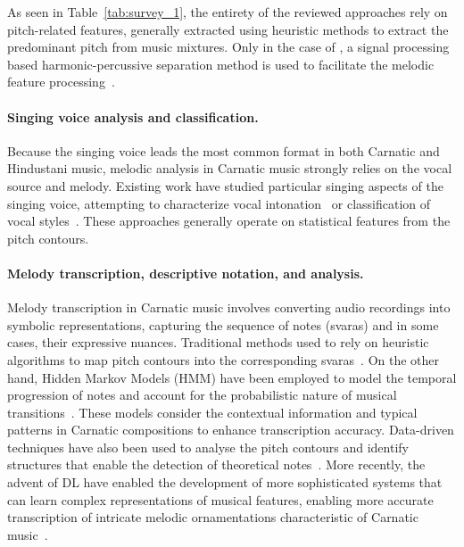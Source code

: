 As seen in Table~\ref{tab:survey_1}, the entirety of the reviewed approaches rely on pitch-related features, generally extracted using heuristic methods to extract the predominant pitch from music mixtures. Only in the case of \citep{singh-tonic}, a signal processing based harmonic-percussive separation method is used to facilitate the melodic feature processing~\citep{driedge-harmonic_separation}.





\paragraph*{Singing voice analysis and classification.}
Because the singing voice leads the most common format in both Carnatic and Hindustani music,
melodic analysis in Carnatic music strongly relies on the vocal source and melody.
%
Existing work have studied particular singing aspects of the singing voice, attempting to characterize vocal intonation~\citep{koduri-characterization,koduri-intonation} or classification of vocal styles~\citep{vidwans-classification}. These approaches generally operate on statistical features from the pitch contours.


\paragraph*{Melody transcription, descriptive notation, and analysis.}
Melody transcription in Carnatic music involves converting audio recordings into symbolic representations, capturing the sequence of notes (svaras) and in some cases, their expressive nuances. Traditional methods used to rely on heuristic algorithms to map pitch contours into the corresponding svaras~\citep{miryala-transcription}. %
On the other hand, Hidden Markov Models (HMM) have been employed to model the temporal progression of notes and account for the probabilistic nature of musical transitions~\citep{ranjani-quantized,ranjani-compact}. These models consider the contextual information and typical patterns in Carnatic compositions to enhance transcription accuracy. 
%
Data-driven techniques have also been used to analyse the pitch contours and identify structures that enable the detection of theoretical notes~\citep{gulati-landmark,ganguli-structures}.
%
More recently, the advent of \acrshort{DL} have enabled the development of more sophisticated systems that can learn complex representations of musical features, enabling more accurate transcription of intricate melodic ornamentations characteristic of Carnatic music~\citep{nuttall-svara}.


